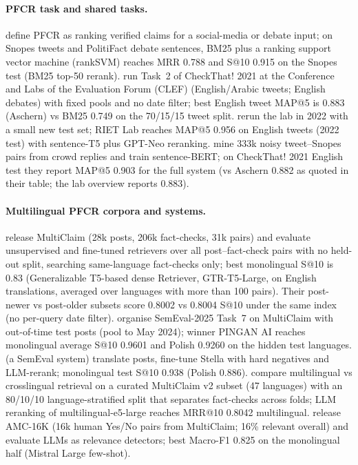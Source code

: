 \documentclass[11pt]{article}
\begin{document}
\paragraph{PFCR task and shared tasks.}
 define PFCR as ranking verified claims for a social-media or debate input; on Snopes tweets and PolitiFact debate sentences, BM25 plus a ranking support vector machine (rankSVM) reaches MRR 0.788 and S@10 0.915 on the Snopes test (BM25 top-50 rerank).
 run Task~2 of CheckThat! 2021 at the Conference and Labs of the Evaluation Forum (CLEF) (English/Arabic tweets; English debates) with fixed pools and no date filter; best English tweet MAP@5 is 0.883 (Aschern) vs BM25 0.749 on the 70/15/15 tweet split.
 rerun the lab in 2022 with a small new test set; RIET Lab reaches MAP@5 0.956 on English tweets (2022 test) with sentence-T5 plus GPT-Neo reranking.
 mine 333k noisy tweet--Snopes pairs from crowd replies and train sentence-BERT; on CheckThat! 2021 English test they report MAP@5 0.903 for the full system (vs Aschern 0.882 as quoted in their table; the lab overview reports 0.883).

\paragraph{Multilingual PFCR corpora and systems.}
 release MultiClaim (28k posts, 206k fact-checks, 31k pairs) and evaluate unsupervised and fine-tuned retrievers over all post--fact-check pairs with no held-out split, searching same-language fact-checks only; best monolingual S@10 is 0.83 (Generalizable T5-based dense Retriever, GTR-T5-Large, on English translations, averaged over languages with more than 100 pairs). Their post-newer vs post-older subsets score 0.8002 vs 0.8004 S@10 under the same index (no per-query date filter).
 organise SemEval-2025 Task~7 on MultiClaim with out-of-time test posts (pool to May 2024); winner PINGAN AI reaches monolingual average S@10 0.9601 and Polish 0.9260 on the hidden test languages.
 (a SemEval system) translate posts, fine-tune Stella with hard negatives and LLM-rerank; monolingual test S@10 0.938 (Polish 0.886).
 compare multilingual vs crosslingual retrieval on a curated MultiClaim v2 subset (47 languages) with an 80/10/10 language-stratified split that separates fact-checks across folds; LLM reranking of multilingual-e5-large reaches MRR@10 0.8042 multilingual.
 release AMC-16K (16k human Yes/No pairs from MultiClaim; 16\% relevant overall) and evaluate LLMs as relevance detectors; best Macro-F1 0.825 on the monolingual half (Mistral Large few-shot).
\end{document}
